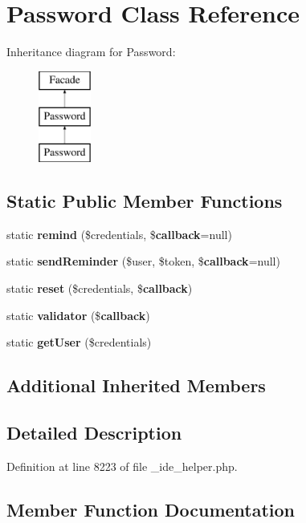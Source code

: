\section{Password Class Reference}
\label{class_password}
Inheritance diagram for Password\+:\begin{figure}[H]
\begin{center}
\leavevmode
\includegraphics[height=3.000000cm]{class_password}
\end{center}
\end{figure}
\subsection*{Static Public Member Functions}
\begin{DoxyCompactItemize}
\item 
static {\bf remind} (\$credentials, \${\bf callback}=null)
\item 
static {\bf send\+Reminder} (\$user, \$token, \${\bf callback}=null)
\item 
static {\bf reset} (\$credentials, \${\bf callback})
\item 
static {\bf validator} (\${\bf callback})
\item 
static {\bf get\+User} (\$credentials)
\end{DoxyCompactItemize}
\subsection*{Additional Inherited Members}


\subsection{Detailed Description}


Definition at line 8223 of file \+\_\+ide\+\_\+helper.\+php.



\subsection{Member Function Documentation}
